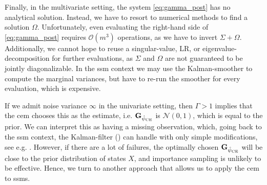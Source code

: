 Finally, in the multivariate setting, the system \eqref{eq:gamma_post} has no analytical solution. Instead, we have to resort to numerical methods to find a solution $\Omega$. Unfortunately, even evaluating the right-hand side of \eqref{eq:gamma_post} requires $\mathcal O(m^3)$ operations, as we have to invert $\Sigma + \Omega$. Additionally, we cannot hope to reuse a singular-value, LR, or eigenvalue-decomposition for further evaluations, as $\Sigma$ and $\Omega$ are not guaranteed to be jointly diagonalizable.
In the \gls{ssm} context we may use the Kalman-smoother to compute the marginal variances, but have to re-run the smoother for every evaluation, which is expensive. 

If we admit noise variance $\infty$ in the univariate setting, then $\Gamma > 1$ implies that the \gls{cem} chooses this as the estimate, i.e. $\mathbf G_{{\hat\psi_{\text{CE}}}}$ is $\mathcal N(0, 1)$, which is equal to the prior. We can interpret this as having a missing observation, which, going back to the \gls{ssm} context, the Kalman-filter () can handle with only simple modifications, see e.g. \citep[Section 4.10]{Durbin2012Time}. However, if there are a lot of failures, the optimally chosen $\mathbf G_{{\hat\psi_{\text{CE}}}}$ will be close to the prior distribution of states $X$, and importance sampling is unlikely to be effective. Hence, we turn to another approach that allows us to apply the \gls{cem} to \glspl{ssm}.

